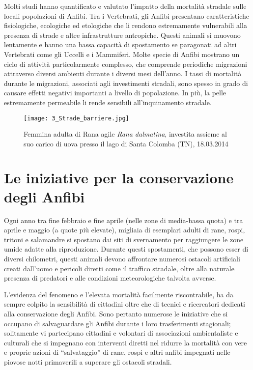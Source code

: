 \documentclass[11pt,a4paper,twoside]{memoir}
\begin{document}
Molti studi hanno quantificato e valutato l’impatto della mortalità stradale sulle locali popolazioni di Anfibi. Tra i Vertebrati, gli Anfibi presentano caratteristiche fisiologiche, ecologiche ed etologiche che li rendono estremamente vulnerabili alla presenza di strade e altre infrastrutture antropiche. Questi animali si muovono lentamente e hanno una bassa capacità di spostamento se paragonati ad altri Vertebrati come gli Uccelli e i Mammiferi. Molte specie di Anfibi mostrano un ciclo di attività particolarmente complesso, che comprende periodiche migrazioni attraverso diversi ambienti durante i diversi mesi dell’anno. I tassi di mortalità durante le migrazioni, associati agli investimenti stradali, sono spesso in grado di causare effetti negativi importanti a livello di popolazione. In più, la pelle estremamente permeabile li rende sensibili all’inquinamento stradale. 

\newpage
\begin{figure}[H]
\label{fig:rana_inv}
\centering
  \texttt{[image: 3\_Strade\_barriere.jpg]}
\caption{Femmina adulta di Rana agile \emph{Rana dalmatina}, investita assieme al suo carico di uova presso il lago di Santa Colomba (TN), 18.03.2014}
\end{figure}

\section{Le iniziative per la conservazione degli Anfibi}
\label{sec:intro_iniziative}
Ogni anno tra fine febbraio e fine aprile (nelle zone di media-bassa quota) e tra aprile e maggio (a quote più elevate), migliaia di esemplari adulti di rane, rospi, tritoni e salamandre si spostano dai siti di svernamento per raggiungere le zone umide adatte alla riproduzione. Durante questi spostamenti, che possono esser di diversi chilometri, questi animali devono affrontare numerosi ostacoli artificiali creati dall’uomo e pericoli diretti come il traffico stradale, oltre alla naturale presenza di predatori e alle condizioni meteorologiche talvolta avverse. 

L’evidenza del fenomeno e l’elevata mortalità facilmente riscontrabile, ha da sempre colpito la sensibilità di cittadini oltre che di tecnici e ricercatori dedicati alla conservazione degli Anfibi. Sono pertanto numerose le iniziative che si occupano di salvaguardare gli Anfibi durante i loro trasferimenti stagionali; solitamente vi partecipano cittadini e volontari di associazioni ambientaliste e culturali che si impegnano con interventi diretti nel ridurre la mortalità con vere e proprie azioni di “salvataggio” di rane, rospi e altri anfibi impegnati nelle piovose notti primaverili a superare gli ostacoli stradali.
\end{document}
